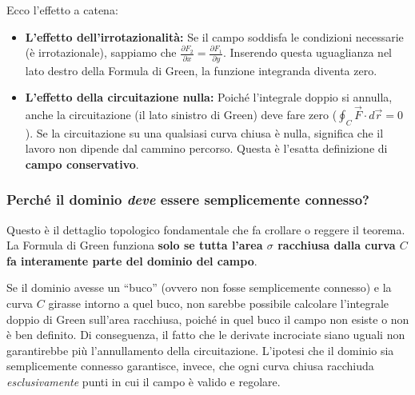 Ecco l'effetto a catena:
\begin{itemize}
    \item \textbf{L'effetto dell'irrotazionalità:} Se il campo soddisfa le condizioni necessarie (è irrotazionale), sappiamo che $\frac{\partial F_2}{\partial x} = \frac{\partial F_1}{\partial y}$. Inserendo questa uguaglianza nel lato destro della Formula di Green, la funzione integranda diventa zero.
    \item \textbf{L'effetto della circuitazione nulla:} Poiché l'integrale doppio si annulla, anche la circuitazione (il lato sinistro di Green) deve fare zero ($\oint_C \vec{F} \cdot d\vec{r} = 0$). Se la circuitazione su una qualsiasi curva chiusa è nulla, significa che il lavoro non dipende dal cammino percorso. Questa è l'esatta definizione di \textbf{campo conservativo}.
\end{itemize}

\subsubsection{Perché il dominio \emph{deve} essere semplicemente connesso?}

Questo è il dettaglio topologico fondamentale che fa crollare o reggere il teorema. La Formula di Green funziona \textbf{solo se tutta l'area $\sigma$ racchiusa dalla curva $C$ fa interamente parte del dominio del campo}.

Se il dominio avesse un ``buco'' (ovvero non fosse semplicemente connesso) e la curva $C$ girasse intorno a quel buco, non sarebbe possibile calcolare l'integrale doppio di Green sull'area racchiusa, poiché in quel buco il campo non esiste o non è ben definito. Di conseguenza, il fatto che le derivate incrociate siano uguali non garantirebbe più l'annullamento della circuitazione. 
L'ipotesi che il dominio sia semplicemente connesso garantisce, invece, che ogni curva chiusa racchiuda \emph{esclusivamente} punti in cui il campo è valido e regolare.